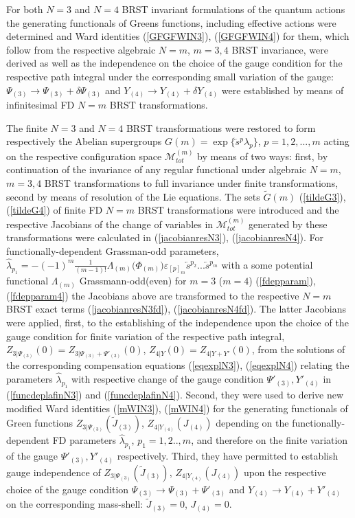 \documentclass[10pt]{article}
\begin{document}
For both $N=3$ and $N=4$ BRST invariant formulations of the quantum actions the generating functionals of Greens functions, including effective actions were determined and Ward identities (\ref{GFGFWIN3}), (\ref{GFGFWIN4}) for them, which  follow from the respective algebraic $N=m$, $m=3,4$ BRST invariance,  were derived as well as the independence on the choice of the gauge condition for the respective path integral under the corresponding small variation of the gauge: $\Psi_{(3)}\to \Psi_{(3)}+\delta\Psi_{(3)}$ and  $Y_{(4)}\to Y_{(4)}+\delta Y_{(4)}$ were established by means of infinitesimal FD $N=m$ BRST transformations.

The finite $N=3$ and $N=4$ BRST transformations were restored to form respectively the Abelian supergroups $G(m) = \exp\{\overleftarrow{s}{}^p \lambda_p\}$, $p=1,2,...,m$  acting on the respective configuration space  $\mathcal{M}^{(m)}_{tot}$ by means of two ways: first, by continuation of the  invariance of any regular functional  under algebraic $N=m$, $m=3,4$ BRST transformations to full invariance under finite transformations, second by means of resolution of the Lie equations.
The sets $\tilde{G}(m)$ (\ref{tildeG3}), (\ref{tildeG4}) of finite FD $N=m$ BRST transformations  were introduced and the respective Jacobians of the change of variables in $\mathcal{M}^{(m)}_{tot}$ generated by these transformations were calculated in (\ref{jacobianresN3}),  (\ref{jacobianresN4}). For  functionally-dependent Grassman-odd parameters, $\hat{\lambda}_{p_1} = -(-1)^m\frac{1}{(m-1)!}\Lambda_{(m)} \big({\Phi}_{(m)}\big)\varepsilon
_{[p]_m}\overleftarrow{s}{}^{p_2}
...\overleftarrow{s}{}^{p_m}$ with a some potential functional $\Lambda_{(m)}$ Grassmann-odd(even) for $m=3$ ($m=4$)    (\ref{fdepparam}), (\ref{fdepparam4}) the Jacobians above are transformed  to the respective $N=m$ BRST exact terms (\ref{jacobianresN3fd}), (\ref{jacobianresN4fd}). The latter Jacobians were applied, first, to the establishing of the  independence upon the choice of  the gauge condition for finite variation of the respective  path integral, $Z_{3|\Psi_{(3)}}(0)=Z_{3|\Psi_{(3)}+\Psi'_{(3)}}(0)$, ${Z}_{4|Y}(0)={Z}_{4|Y+Y'}(0)$, from the solutions of the corresponding compensation equations (\ref{eqexplN3}), (\ref{eqexplN4}) relating   the parameters $\hat{\lambda}_{p_1}$ with respective change of the gauge condition $\Psi'_{(3)}, Y'_{(4)}$ in (\ref{funcdeplafinN3})  and (\ref{funcdeplafinN4}). Second, they were used  to derive new  modified   Ward identities (\ref{mWIN3}), (\ref{mWIN4}) for the generating functionals of Green functions $Z_{3|\Psi_{(3)}}(\widetilde{J}_{(3)})$, $Z_{4|Y_{(4)}}({J}_{(4)})$   depending on the functionally-dependent FD parameters $\hat{\lambda}_{p_1}$, $p_1=1,2..,m$, and therefore on the finite variation of the gauge $\Psi'_{(3)}, Y'_{(4)}$  respectively. Third, they have permitted to establish gauge independence of  $Z_{3|\Psi_{(3)}}(\widetilde{J}_{(3)})$, $Z_{4|Y_{(4)}}({J}_{(4)})$ upon the respective choice of the gauge condition $\Psi_{(3)}\to \Psi_{(3)}+\Psi'_{(3)}$ and  $Y_{(4)}\to Y_{(4)}+Y'_{(4)}$  on the corresponding mass-shell: $\widetilde{J}_{(3)}=0$, ${J}_{(4)}=0$.
\end{document}
